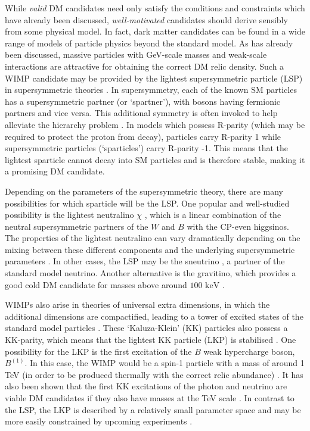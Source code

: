 
While \textit{valid} DM candidates need only satisfy the conditions and constraints which have already been discussed, \textit{well-motivated} candidates should derive sensibly from some physical model. In fact, dark matter candidates can be found in a wide range of models of particle physics beyond the standard model. As has already been discussed, massive particles with GeV-scale masses and weak-scale interactions are attractive for obtaining the correct DM relic density. Such a WIMP candidate may be provided by the lightest supersymmetric particle (LSP) in supersymmetric theories \cite{Jungman:1995}. In supersymmetry, each of the known SM particles has a supersymmetric partner (or `spartner'), with bosons having fermionic partners and vice versa. This additional symmetry is often invoked to help alleviate the hierarchy problem \cite{Kane:2011}. In models which possess R-parity (which may be required to protect the proton from decay), particles carry R-parity 1 while supersymmetric particles (`sparticles') carry R-parity -1. This means that the lightest sparticle cannot decay into SM particles and is therefore stable, making it a promising DM candidate.


Depending on the parameters of the supersymmetric theory, there are many possibilities for which sparticle will be the LSP. One popular and well-studied possibility is the lightest neutralino $\chi$ \cite{Ellis:1984}, which is a linear combination of the neutral supersymmetric partners of the $W$ and $B$ with the CP-even higgsinos. The properties of the lightest neutralino can vary dramatically depending on the mixing between these different components and the underlying supersymmetric parameters \cite{Shakya:2013}. In other cases, the LSP may be the sneutrino \cite{Choi:2013}, a partner of the standard model neutrino. %
Another alternative is the gravitino, which provides a good cold DM candidate for masses above around $100 \textrm{ keV}$ \cite{Steffen:2006}.

WIMPs also arise in theories of universal extra dimensions, in which the additional dimensions are compactified, leading to a tower of excited states of the standard model particles \cite{Duff:1994}. These `Kaluza-Klein' (KK) particles also possess a KK-parity, which means that the lightest KK particle (LKP) is stabilised \cite{Appelquist:2001}. One possibility for the LKP is the first excitation of the $B$ weak hypercharge boson, $B^{(1)}$. In this case, the WIMP would be a spin-1 particle with a mass of around 1 TeV (in order to be produced thermally with the correct relic abundance) \cite{Cheng:2002}. It has also been shown that the first KK excitations of the photon and neutrino are viable DM candidates if they also have masses at the TeV scale \cite{Servant:2002}. In contrast to the LSP, the LKP is described by a relatively small parameter space and may be more easily constrained by upcoming experiments \cite{Bergstrom:2009}.

